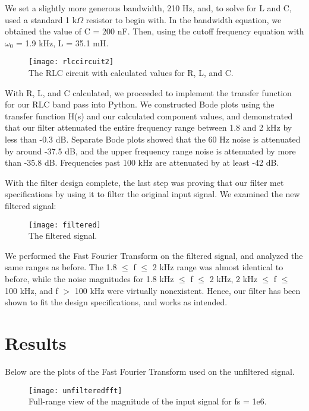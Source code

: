 \documentclass[11pt,a4,titlepage]{article}
\begin{document}
We set a slightly more generous bandwidth, 210 Hz, and, to solve for L and C, used a standard 1 k$\Omega$ resistor to begin with. In the bandwidth equation, we obtained the value of C = 200 nF. Then, using the cutoff frequency equation with $\omega_{0}$ = 1.9 kHz, L = 35.1 mH.

\begin{figure}[H]
	\centering
	\texttt{[image: rlccircuit2]}
	\\ The RLC circuit with calculated values for R, L, and C.
\end{figure}

With R, L, and C calculated, we proceeded to implement the transfer function for our RLC band pass into Python. We constructed Bode plots using the transfer function H(s) and our calculated component values, and demonstrated that our filter attenuated the entire frequency range between 1.8 and 2 kHz by less than -0.3 dB. Separate Bode plots showed that the 60 Hz noise is attenuated by around -37.5 dB, and the upper frequency range noise is attenuated by more than -35.8 dB. Frequencies past 100 kHz are attenuated by at least -42 dB.

With the filter design complete, the last step was proving that our filter met specifications by using it to filter the original input signal. We examined the new filtered signal:

\begin{figure}[H]
	\centering
	\texttt{[image: filtered]}
	\\ The filtered signal.
\end{figure}

We performed the Fast Fourier Transform on the filtered signal, and analyzed the same ranges as before. The 1.8 $\leq$ f $\leq$ 2 kHz range was almost identical to before, while the noise magnitudes for 1.8 kHz $\leq$ f $\leq$ 2 kHz, 2 kHz $\leq$ f $\leq$ 100 kHz, and f $>$ 100 kHz were virtually nonexistent. Hence, our filter has been shown to fit the design specifications, and works as intended.

\section{Results}
Below are the plots of the Fast Fourier Transform used on the unfiltered signal.
\begin{figure}[H]
	\centering
	\texttt{[image: unfilteredfft]}
	\\ Full-range view of the magnitude of the input signal for fs = 1e6.
\end{figure}
\end{document}
